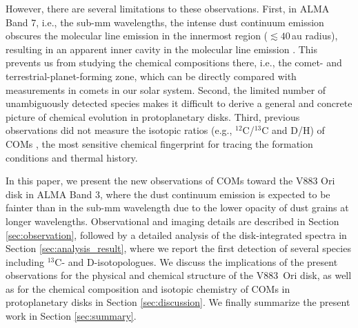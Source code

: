 \documentclass[linenumbers, twocolumn, twocolappendix, astrosymb, times]{aastex631}
\newcommand{\methanol}{CH$_3$OH\xspace}
\begin{document}
However, there are several limitations to these observations. First, in ALMA Band 7, i.e., the sub-mm wavelengths, the intense dust continuum emission obscures the molecular line emission in the innermost region ($\lesssim40$\,au radius), resulting in an apparent inner cavity in the molecular line emission \citep{vantHoff2018, Lee2019, Tobin2023}. This prevents us from studying the chemical compositions there, i.e., the comet- and terrestrial-planet-forming zone, which can be directly compared with measurements in comets in our solar system. Second, the limited number of unambiguously detected species \citep{Lee2019} makes it difficult to derive a general and concrete picture of chemical evolution in protoplanetary disks. Third, previous observations did not measure the isotopic ratios (e.g., $^{12}$C/$^{13}$C and D/H) of COMs \citep[except for the D/H ratio of \methanol;][]{Lee2019, Lee2023}, the most sensitive chemical fingerprint for tracing the formation conditions and thermal history.

In this paper, we present the new observations of COMs toward the V883 Ori disk in ALMA Band 3, where the dust continuum emission is expected to be fainter than in the sub-mm wavelength due to the lower opacity of dust grains at longer wavelengths. Observational and imaging details are described in Section \ref{sec:observation}, followed by a detailed analysis of the disk-integrated spectra in Section \ref{sec:analysis_result}, where we report the first detection of several species including $^{13}$C- and D-isotopologues. We discuss the implications of the present observations for the physical and chemical structure of the V883~Ori disk, as well as for the chemical composition and isotopic chemistry of COMs in protoplanetary disks in Section \ref{sec:discussion}. We finally summarize the present work in Section \ref{sec:summary}.

\end{document}
